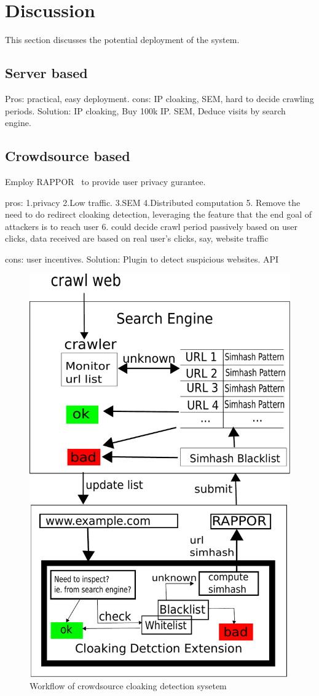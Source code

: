 \section{Discussion}
\label{s:discussion}

This section discusses the potential deployment of the system.
\subsection{Server based}

Pros:	practical, easy deployment.
cons:	IP cloaking, SEM, hard to decide crawling periods. 
Solution: IP cloaking, Buy 100k IP.
SEM, Deduce visits by search engine. 

\subsection{Crowdsource based}
Employ RAPPOR~\cite{erlingsson2014rappor} to provide user privacy gurantee.

pros: 	1.privacy 2.Low traffic. 3.SEM 4.Distributed computation 
5. Remove the need to do redirect cloaking detection, leveraging the feature
that the end goal of attackers is to reach user
6. could decide crawl period passively based on user clicks, data received are
based on real user’s clicks, say, website traffic

cons: user incentives. 
Solution: Plugin to detect suspicious websites. API


\begin{figure}[t]
  \centering
  \includegraphics[width=.5\textwidth]{fig/workflow}
  \caption{Workflow of crowdsource cloaking detection sysetem}
  \label{fig:workflow}
\end{figure}


